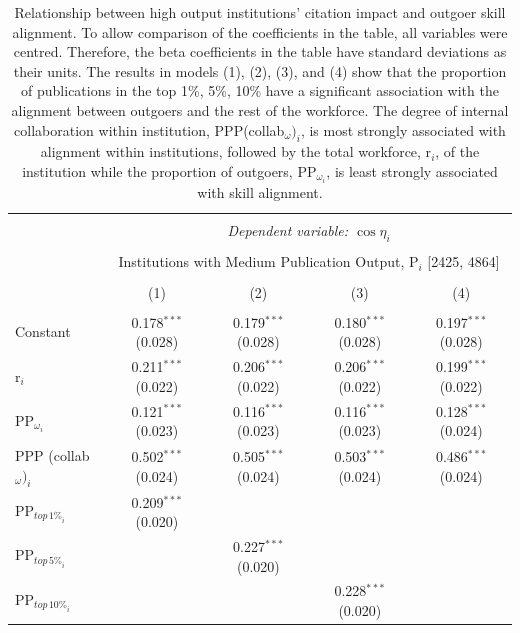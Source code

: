 \documentclass[draft,final]{vutinfth} %
\begin{document}
\begin{table} \centering 
  \caption{Relationship between high output institutions' citation impact and outgoer skill alignment. To allow comparison of the coefficients in the table, all variables were centred. Therefore, the beta coefficients in the table have standard deviations as their units. The results in models (1), (2), (3), and (4) show that the proportion of publications in the top 1\%, 5\%, 10\% have a significant association with the alignment between outgoers and the rest of the workforce. The degree of internal collaboration within institution, PPP(collab$_{\omega})_{i}$, is most strongly associated with alignment within institutions, followed by the total workforce, r$_{i}$, of the institution while the proportion of outgoers, PP$_{\omega_i}$, is least strongly associated with skill alignment.} 
  \label{Table S6} 
\small 
\scriptsize
\begin{tabularx}{\textwidth}{@{\extracolsep{\fill}}lcccc}
\\[-1.8ex]\hline 
\hline \\[-1.8ex] 
 & \multicolumn{4}{c}{\textit{Dependent variable: $\cos{\eta}_{i}$}} \\ 
\cline{2-5} 
\\[-1.8ex] & \multicolumn{4}{c}{Institutions with Medium Publication Output, P$_{i}$ [2425, 4864]} \\ 
\\[-1.8ex] & (1) & (2) & (3) & (4)\\ 
\hline \\[-1.8ex] 
 Constant & 0.178$^{***}$ (0.028) & 0.179$^{***}$ (0.028) & 0.180$^{***}$ (0.028) & 0.197$^{***}$ (0.028) \\ 
  r$_{i}$ & 0.211$^{***}$ (0.022) & 0.206$^{***}$ (0.022) & 0.206$^{***}$ (0.022) & 0.199$^{***}$ (0.022) \\ 
  PP$_{\omega_i}$ & 0.121$^{***}$ (0.023) & 0.116$^{***}$ (0.023) & 0.116$^{***}$ (0.023) & 0.128$^{***}$ (0.024) \\ 
  PPP (collab$_\omega)_{i}$  & 0.502$^{***}$ (0.024) & 0.505$^{***}$ (0.024) & 0.503$^{***}$ (0.024) & 0.486$^{***}$ (0.024) \\ 
  PP$_{{top\,1\%}_{i}}$ & 0.209$^{***}$ (0.020) &  &  &  \\ 
  PP$_{{top\,5\%}_{i}}$ &  & 0.227$^{***}$ (0.020) &  &  \\ 
  PP$_{{top\,10\%}_{i}}$ &  &  & 0.228$^{***}$ (0.020) &  \\ 

\end{tabularx}
\end{table}
\end{document}
